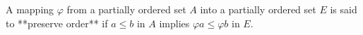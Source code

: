 A mapping $\varphi$ from a partially ordered set $A$ into a partially ordered set $E$ is said to **preserve order** if $a \leq b$ in $A$ implies $\varphi a \leq \varphi b$ in $E$.